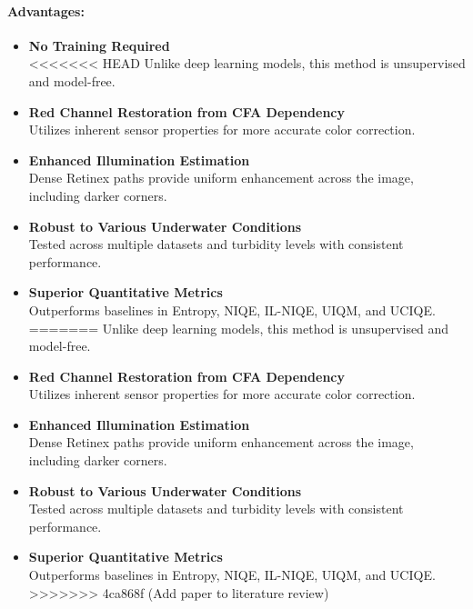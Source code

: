 \documentclass{article}
\begin{document}
\paragraph{Advantages:}
\begin{itemize}
    \item \textbf{No Training Required} \\
<<<<<<< HEAD
    Unlike deep learning models, this method is unsupervised and model-free.

    \item \textbf{Red Channel Restoration from CFA Dependency} \\
    Utilizes inherent sensor properties for more accurate color correction.

    \item \textbf{Enhanced Illumination Estimation} \\
    Dense Retinex paths provide uniform enhancement across the image, including darker corners.

    \item \textbf{Robust to Various Underwater Conditions} \\
    Tested across multiple datasets and turbidity levels with consistent performance.

    \item \textbf{Superior Quantitative Metrics} \\
    Outperforms baselines in Entropy, NIQE, IL-NIQE, UIQM, and UCIQE.
=======
          Unlike deep learning models, this method is unsupervised and model-free.

    \item \textbf{Red Channel Restoration from CFA Dependency} \\
          Utilizes inherent sensor properties for more accurate color correction.

    \item \textbf{Enhanced Illumination Estimation} \\
          Dense Retinex paths provide uniform enhancement across the image, including darker corners.

    \item \textbf{Robust to Various Underwater Conditions} \\
          Tested across multiple datasets and turbidity levels with consistent performance.

    \item \textbf{Superior Quantitative Metrics} \\
          Outperforms baselines in Entropy, NIQE, IL-NIQE, UIQM, and UCIQE.
>>>>>>> 4ca868f (Add paper to literature review)
\end{itemize}
\end{document}
